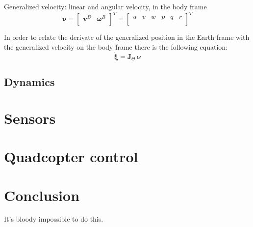 \documentclass[journal]{IEEEtran}
\begin{document}
	Generalized velocity: linear and angular velocity, in the body frame
	\begin{equation} \label{eq:vel}
		\bm{\nu} = \left[ \begin{array}{cc}
		\bm{v}^B & \bm{\omega}^B \\
		\end{array}\right]^T = \left[ \begin{array}{cccccc}
		u & v & w & p & q & r\\
		\end{array}\right] ^T 
	\end{equation}
	
	In order to relate the derivate of the generalized position in the Earth frame with the generalized velocity on the body frame there is the following equation:
	\begin{equation} \label{eq:derivpos_earth_body}
		\bm{\dot \xi} =  \bm{J}_\Theta \	\bm{\nu}
	\end{equation}


	
	\subsection{Dynamics}

\section{Sensors}

\section{Quadcopter control}

\section{Conclusion}
It's bloody impossible to do this.




\end{document}
